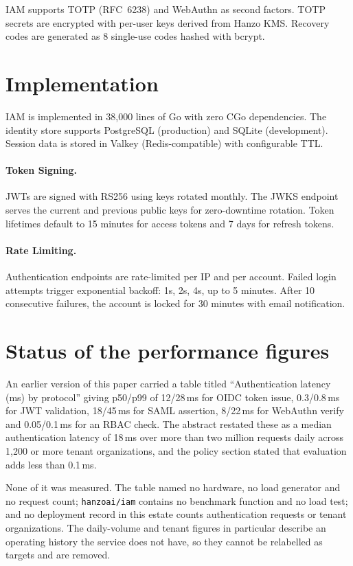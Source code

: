 \documentclass[11pt,twocolumn]{article}
\begin{document}
IAM supports TOTP (RFC~6238) and WebAuthn as second factors. TOTP secrets are encrypted with per-user keys derived from Hanzo KMS. Recovery codes are generated as 8 single-use codes hashed with bcrypt.

\section{Implementation}

IAM is implemented in 38,000 lines of Go with zero CGo dependencies. The identity store supports PostgreSQL (production) and SQLite (development). Session data is stored in Valkey (Redis-compatible) with configurable TTL.

\paragraph{Token Signing.} JWTs are signed with RS256 using keys rotated monthly. The JWKS endpoint serves the current and previous public keys for zero-downtime rotation. Token lifetimes default to 15 minutes for access tokens and 7 days for refresh tokens.

\paragraph{Rate Limiting.} Authentication endpoints are rate-limited per IP and per account. Failed login attempts trigger exponential backoff: 1s, 2s, 4s, up to 5 minutes. After 10 consecutive failures, the account is locked for 30 minutes with email notification.

\section{Status of the performance figures}
\label{sec:figures}

An earlier version of this paper carried a table titled ``Authentication latency
(ms) by protocol'' giving p50/p99 of 12/28\,ms for OIDC token issue, 0.3/0.8\,ms
for JWT validation, 18/45\,ms for SAML assertion, 8/22\,ms for WebAuthn verify
and 0.05/0.1\,ms for an RBAC check. The abstract restated these as a median
authentication latency of 18\,ms over more than two million requests daily
across 1{,}200 or more tenant organizations, and the policy section stated that
evaluation adds less than 0.1\,ms.

None of it was measured. The table named no hardware, no load generator and no
request count; \texttt{hanzoai/iam} contains no benchmark function and no load
test; and no deployment record in this estate counts authentication requests or
tenant organizations. The daily-volume and tenant figures in particular describe
an operating history the service does not have, so they cannot be relabelled as
targets and are removed.
\end{document}
